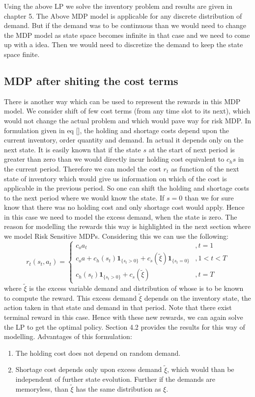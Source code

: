 \documentclass[11pt,a4paper,oneside]{report}
\begin{document}
Using the above LP we solve the inventory problem and results are given in chapter 5. The Above MDP model is  applicable for any discrete distribution of demand. But if the demand was to be continuous than we would need to change the MDP model as state space becomes infinite in that case and we need to come up with a idea. Then we would need to discretize the demand to keep the state space finite. 
\subsection{MDP after shiting the cost terms}
There is another way which can be used to represent the rewards in this MDP model. We consider  shift of few cost terms (from any time slot to its next), which would not change the actual problem and which would pave way for risk MDP. In formulation given in eq [], the holding and shortage costs depend upon the current inventory, order quantity and demand. In actual it depends only on the next state. It is easily known that if the state $s$ at the start of next period is greater than zero than we would directly incur holding cost equivalent to $c_hs$ in the current period. Therefore we can model the cost $r_t$ as function of the next state of inventory which would give us information on which of the cost is applicable in the previous period. So one can shift the holding and shortage costs to the next period where we would know the state. If $s=0$ than we for sure know that there was no holding cost and only shortage cost would apply.
Hence in this case we need to model the excess demand, when the state is zero. The reason for modelling the rewards this way is highlighted in the next section where we model Risk Sensitive MDPs. Considering this we can use the following:\\
\begin{equation}
r_t(s_t,a_t)=
\begin{cases}
c_{o}a_t&,t=1\\
c_{o}a + c_h(s_t)\mathbf{1}_{\lbrace s_t>0\rbrace} + c_s(\tilde{\xi})\mathbf{1}_{\lbrace s_t=0\rbrace}&,1<t< T\\
c_h(s_t)\mathbf{1}_{\lbrace s_t>0\rbrace} + c_s(\tilde{\xi})&,t=T
\end{cases}
\end{equation}
\noindent where $\tilde{\xi}$ is the excess variable demand and distribution of whose is to be known to compute the reward. This excess demand $\tilde{\xi}$ depends on the inventory state, the action taken in that state and demand in that period. Note that there exist terminal reward in this case. Hence with these new rewards, we can again solve the LP to get the optimal policy. Section 4.2 provides the results for this way of modelling. 
Advantages of this formulation:
\begin{enumerate}
\item The holding cost does not depend on random demand.
\item Shortage cost depends only upon excess demand $\tilde\xi$, which would than be independent of further state evolution. Further if the demands are memoryless, than $\tilde{\xi}$ has the same distribution as $\xi$.
\end{enumerate}
\end{document}
